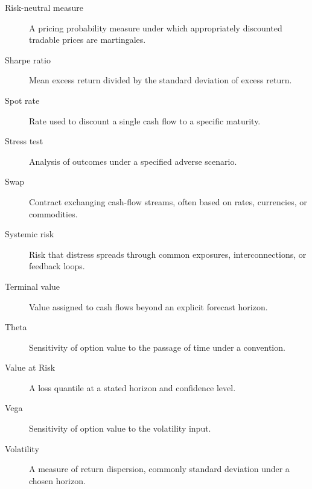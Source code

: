 \begin{description}
\item[Risk-neutral measure] A pricing probability measure under which appropriately discounted tradable prices are martingales.
\item[Sharpe ratio] Mean excess return divided by the standard deviation of excess return.
\item[Spot rate] Rate used to discount a single cash flow to a specific maturity.
\item[Stress test] Analysis of outcomes under a specified adverse scenario.
\item[Swap] Contract exchanging cash-flow streams, often based on rates, currencies, or commodities.
\item[Systemic risk] Risk that distress spreads through common exposures, interconnections, or feedback loops.
\item[Terminal value] Value assigned to cash flows beyond an explicit forecast horizon.
\item[Theta] Sensitivity of option value to the passage of time under a convention.
\item[Value at Risk] A loss quantile at a stated horizon and confidence level.
\item[Vega] Sensitivity of option value to the volatility input.
\item[Volatility] A measure of return dispersion, commonly standard deviation under a chosen horizon.
\end{description}
